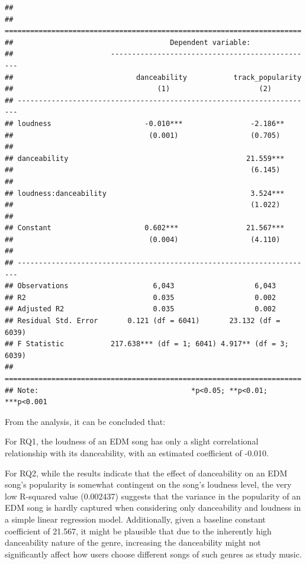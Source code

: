 \documentclass[
]{book}
\begin{document}
\begin{verbatim}
## 
## ======================================================================
##                                     Dependent variable:               
##                       ------------------------------------------------
##                             danceability           track_popularity   
##                                  (1)                     (2)          
## ----------------------------------------------------------------------
## loudness                      -0.010***                -2.186**       
##                                (0.001)                 (0.705)        
##                                                                       
## danceability                                          21.559***       
##                                                        (6.145)        
##                                                                       
## loudness:danceability                                  3.524***       
##                                                        (1.022)        
##                                                                       
## Constant                      0.602***                21.567***       
##                                (0.004)                 (4.110)        
##                                                                       
## ----------------------------------------------------------------------
## Observations                    6,043                   6,043         
## R2                              0.035                   0.002         
## Adjusted R2                     0.035                   0.002         
## Residual Std. Error       0.121 (df = 6041)       23.132 (df = 6039)  
## F Statistic           217.638*** (df = 1; 6041) 4.917** (df = 3; 6039)
## ======================================================================
## Note:                                    *p<0.05; **p<0.01; ***p<0.001
\end{verbatim}

From the analysis, it can be concluded that:

For RQ1, the loudness of an EDM song has only a slight correlational relationship with its danceability, with an estimated coefficient of -0.010.

For RQ2, while the results indicate that the effect of danceability on an EDM song's popularity is somewhat contingent on the song's loudness level, the very low R-squared value (0.002437) suggests that the variance in the popularity of an EDM song is hardly captured when considering only danceability and loudness in a simple linear regression model. Additionally, given a baseline constant coefficient of 21.567, it might be plausible that due to the inherently high danceability nature of the genre, increasing the danceability might not significantly affect how users choose different songs of such genres as study music.
\end{document}
